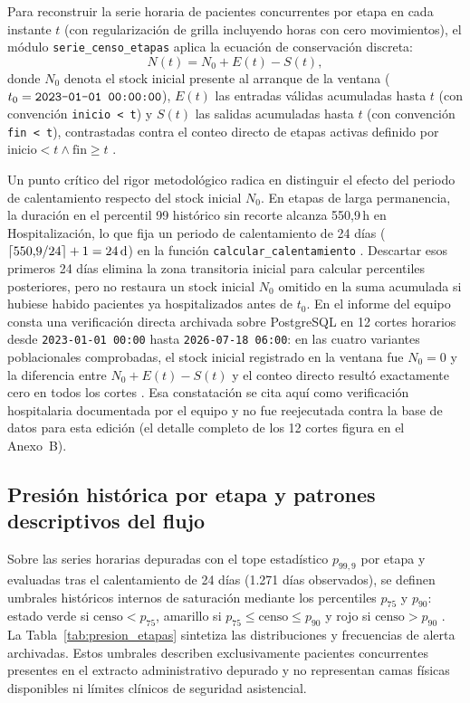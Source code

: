 Para reconstruir la serie horaria de pacientes concurrentes por etapa en cada instante $t$ (con regularización de grilla incluyendo horas con cero movimientos), el módulo \texttt{serie\_censo\_etapas} aplica la ecuación de conservación discreta:
\begin{equation}
\label{eq:balance_censo}
N(t) = N_0 + E(t) - S(t),
\end{equation}
donde $N_0$ denota el stock inicial presente al arranque de la ventana ($t_0 = \text{\texttt{2023-01-01 00:00:00}}$), $E(t)$ las entradas válidas acumuladas hasta $t$ (con convención \texttt{inicio < t}) y $S(t)$ las salidas acumuladas hasta $t$ (con convención \texttt{fin < t}), contrastadas contra el conteo directo de etapas activas definido por $\text{inicio} < t \land \text{fin} \ge t$ \parencite{mediflow2026informe,mediflow2026saturacion}.

Un punto crítico del rigor metodológico radica en distinguir el efecto del periodo de calentamiento respecto del stock inicial $N_0$. En etapas de larga permanencia, la duración en el percentil 99 histórico sin recorte alcanza 550,9\,h en Hospitalización, lo que fija un periodo de calentamiento de 24 días ($\lceil 550{,}9 / 24 \rceil + 1 = 24\text{\,d}$) en la función \texttt{calcular\_calentamiento} \parencite{mediflow2026saturacion}. Descartar esos primeros 24 días elimina la zona transitoria inicial para calcular percentiles posteriores, pero no restaura un stock inicial $N_0$ omitido en la suma acumulada si hubiese habido pacientes ya hospitalizados antes de $t_0$. En el informe del equipo consta una verificación directa archivada sobre PostgreSQL en 12 cortes horarios desde \texttt{2023-01-01 00:00} hasta \texttt{2026-07-18 06:00}: en las cuatro variantes poblacionales comprobadas, el stock inicial registrado en la ventana fue $N_0 = 0$ y la diferencia entre $N_0 + E(t) - S(t)$ y el conteo directo resultó exactamente cero en todos los cortes \parencite{mediflow2026informe}. Esa constatación se cita aquí como verificación hospitalaria documentada por el equipo y no fue reejecutada contra la base de datos para esta edición (el detalle completo de los 12 cortes figura en el Anexo~B).

\subsection{Presión histórica por etapa y patrones descriptivos del flujo}

Sobre las series horarias depuradas con el tope estadístico $p_{99{,}9}$ por etapa y evaluadas tras el calentamiento de 24 días (1.271 días observados), se definen umbrales históricos internos de saturación mediante los percentiles $p_{75}$ y $p_{90}$: estado verde si $\text{censo} < p_{75}$, amarillo si $p_{75} \le \text{censo} \le p_{90}$ y rojo si $\text{censo} > p_{90}$ \parencite{mediflow2026saturacion}. La Tabla~\ref{tab:presion_etapas} sintetiza las distribuciones y frecuencias de alerta archivadas. Estos umbrales describen exclusivamente pacientes concurrentes presentes en el extracto administrativo depurado y no representan camas físicas disponibles ni límites clínicos de seguridad asistencial.

